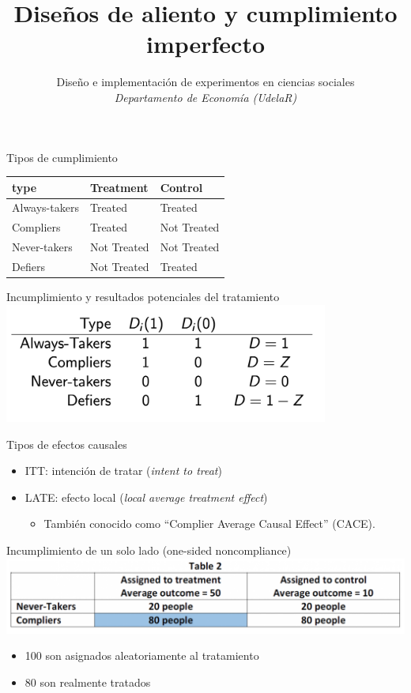 \documentclass[
  ignorenonframetext,
]{beamer}
\title{Diseños de aliento y cumplimiento imperfecto}
\author{Diseño e implementación de experimentos en ciencias sociales\\
\emph{Departamento de Economía (UdelaR)}}
\date{}
\providecommand{\tightlist}{%
  \setlength{\itemsep}{0pt}\setlength{\parskip}{0pt}}
\begin{document}
\frame{\titlepage}

\begin{frame}{Tipos de cumplimiento}
\protect\hypertarget{tipos-de-cumplimiento}{}
\begin{longtable}[]{@{}lll@{}}
\toprule
type & Treatment & Control\tabularnewline
\midrule
\endhead
Always-takers & Treated & Treated\tabularnewline
Compliers & Treated & Not Treated\tabularnewline
Never-takers & Not Treated & Not Treated\tabularnewline
Defiers & Not Treated & Treated\tabularnewline
\bottomrule
\end{longtable}
\end{frame}

\begin{frame}{Incumplimiento y resultados potenciales del tratamiento}
\protect\hypertarget{incumplimiento-y-resultados-potenciales-del-tratamiento}{}
\center \includegraphics[width=0.8\textwidth,height=\textheight]{figs/one_sided}
\end{frame}

\begin{frame}{Tipos de efectos causales}
\protect\hypertarget{tipos-de-efectos-causales}{}
\begin{itemize}[<+->]
\tightlist
\item
  ITT: intención de tratar (\emph{intent to treat})
\item
  LATE: efecto local (\emph{local average treatment effect})

  \begin{itemize}[<+->]
  \tightlist
  \item
    También conocido como ``Complier Average Causal Effect'' (CACE).
  \end{itemize}
\end{itemize}
\end{frame}

\begin{frame}{Incumplimiento de un solo lado (one-sided noncompliance)}
\protect\hypertarget{incumplimiento-de-un-solo-lado-one-sided-noncompliance}{}
\center \includegraphics[width=1\textwidth,height=\textheight]{figs/compliers}

\begin{itemize}
\tightlist
\item
  100 son asignados aleatoriamente al tratamiento \pause 
\item
  80 son realmente tratados
\end{itemize}
\end{frame}
\end{document}
